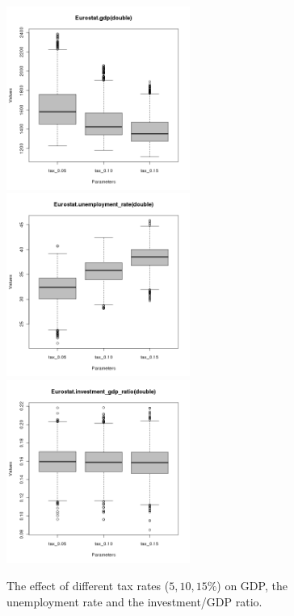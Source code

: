 \begin{figure}[ht!]
\centering\leavevmode
\begin{minipage}{7.5cm}
\centering\leavevmode
\includegraphics[width=6cm]{./batch/Eurostat-gdp-scenarios.png}\\
\includegraphics[width=6cm]{./batch/Eurostat-unemployment_rate-scenarios.png}\\
\includegraphics[width=6cm]{./batch/Eurostat-investment_gdp_ratio-scenarios.png}
\end{minipage}
\caption{The effect of different tax rates ($5, 10, 15\%$) on GDP, the unemployment rate and the investment/GDP ratio.}
\label{Figure: scenarios}
\end{figure}
